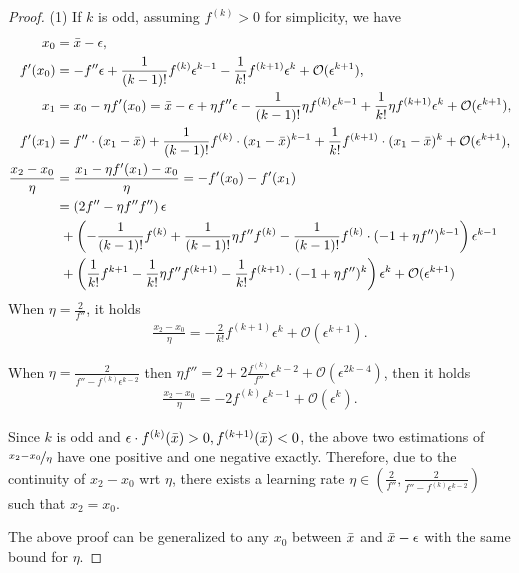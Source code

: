 \documentclass{article}
\theoremstyle{plain}
\theoremstyle{remark}
\newcommand{\T}[1]{^{(#1)}}
\def\O{\mathcal{O}}
\begin{document}
\begin{proof}
(1) 
If $k$ is odd, assuming $f\T{k}>0$ for simplicity, we have
\begin{align*}
    x_0 &= \Bar{x}-\epsilon, \\
    f'(x_0) &= -f''\epsilon + \frac{1}{(k-1)!}f\T{k}\epsilon^{k-1}-\frac{1}{k!}f\T{k+1}\epsilon^k + \O(\epsilon^{k+1}),\\
    x_1 &= x_0-\eta f'(x_0) = \Bar{x}-\epsilon +\eta f''\epsilon - \frac{1}{(k-1)!}\eta f\T{k}\epsilon^{k-1}+\frac{1}{k!}\eta f\T{k+1}\epsilon^k  + \O(\epsilon^{k+1}),\\
    f'(x_1) &= f''\cdot(x_1-\Bar{x})+\frac{1}{(k-1)!}f\T{k}\cdot(x_1-\Bar{x})^{k-1}+\frac{1}{k!}f\T{k+1}\cdot(x_1-\Bar{x})^{k}+\O(\epsilon^{k+1}), \\
    \frac{x_2-x_0}{\eta} &= \frac{x_1-\eta f'(x_1)-x_0}{\eta} =-f'(x_0)-f'(x_1) \\
    &= \left(2f''-\eta f''f''\right)\epsilon \\
    &~ +\left(-\frac{1}{(k-1)!}f\T{k}+\frac{1}{(k-1)!}\eta f''f\T{k}-\frac{1}{(k-1)!}f\T{k}\cdot(-1+\eta f'')^{k-1}\right)\epsilon^{k-1}\\
    &~ +\left(\frac{1}{k!}f^{k+1}-\frac{1}{k!}\eta f'' f\T{k+1}-\frac{1}{k!}f\T{k+1}\cdot(-1+\eta f'')^k\right)\epsilon^k + \O(\epsilon^{k+1})
\end{align*}
When $\eta=\frac{2}{f''}$, it holds
\begin{align}
    \frac{x_2-x_0}{\eta}=-\frac{2}{k!}f\T{k+1}\epsilon^k+ \O(\epsilon^{k+1}).\label{eq:temp1}
\end{align}

When $\eta=\frac{2}{f''-f\T{k}\epsilon^{k-2}}$ then $\eta f''=2+2\frac{f\T{k}}{f''}\epsilon^{k-2}+\O(\epsilon^{2k-4})$, then it holds
\begin{align}
    \frac{x_2-x_0}{\eta}=-2f\T{k}\epsilon^{k-1}+\O(\epsilon^k).\label{eq:temp2}
\end{align}

Since $k$ is odd and $\epsilon\cdot f\T{k}(\Bar{x})>0, f\T{k+1}(\Bar{x})<0$, the above two estimations of $\nicefrac{x_2-x_0}{\eta}$ have one positive and one negative exactly. Therefore, due to the continuity of $x_2-x_0$ wrt $\eta$, there exists a learning rate $\eta\in(\frac{2}{f''}, \frac{2}{f''-f\T{k}\epsilon^{k-2}})$ such that $x_2=x_0$.

The above proof can be generalized to any $x_0$ between $\Bar{x}$ and $\Bar{x}-\epsilon$ with the same bound for $\eta$.


\end{proof}
\end{document}
